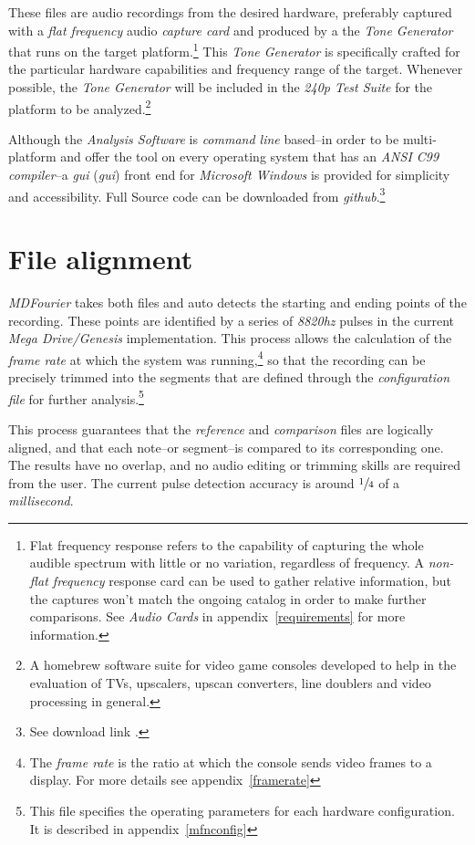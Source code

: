 \documentclass[10pt,a4paper]{report}
\newcommand{\define}[1]{\textit{\acrlong{#1}} (\textit{\acrshort{#1}})}
\newcommand{\hz}[1]{\textit{\mbox{#1\acrshort{hz}}}}
\begin{document}
These files are audio recordings from the desired hardware, preferably captured with a \textit{flat frequency} audio \textit{capture card} and produced by a the \textit{Tone Generator} that runs on the target platform.\footnote{Flat frequency response refers to the capability of capturing the whole audible spectrum with little or no variation, regardless of frequency. A \textit{non-flat frequency} response card can be used to gather relative information, but the captures won't match the ongoing catalog in order to make further comparisons. See \textit{Audio Cards} in appendix~\ref{requirements} for more information.} This \textit{Tone Generator} is specifically crafted for the particular hardware capabilities and frequency range of the target. Whenever possible, the \textit{Tone Generator} will be included in the \textit{240p Test Suite} for the platform to be analyzed.\footnote{A homebrew software suite for video game consoles developed to help in the evaluation of TVs, upscalers, upscan converters, line doublers and video processing in general.\cite{240pSuite}}

Although the \textit{Analysis Software} is \textit{command line} based--in order to be multi-platform and offer the tool on every operating system that has an \textit{ANSI C99 compiler}--a \define{gui} front end for \textit{Microsoft Windows} is provided for simplicity and accessibility. Full Source code can be downloaded from \textit{github}.\footnote{See download link \cite{sourcecode}.}

\section{File alignment}

\textit{MDFourier} takes both files and auto detects the starting and ending points of the recording. These points are identified by a series of \hz{8820} pulses in the current \textit{Mega Drive/Genesis} implementation. This process allows the calculation of the \textit{frame rate} at which the system was running,\footnote{The \textit{frame rate} is the ratio at which the console sends video frames to a display. For more details see appendix~\ref{framerate}} so that the recording can be precisely trimmed into the segments that are defined through the \textit{configuration file} for further analysis.\footnote{This file specifies the operating parameters for each hardware configuration. It is described in appendix~\ref{mfnconfig}}

This process guarantees that the \textit{reference} and \textit{comparison} files are logically aligned, and that each note--or segment--is compared to its corresponding one. The results have no overlap, and no audio editing or trimming skills are required from the user. The current pulse detection accuracy is around $\sfrac{1}{4}$ of a \textit{millisecond}.
\end{document}

